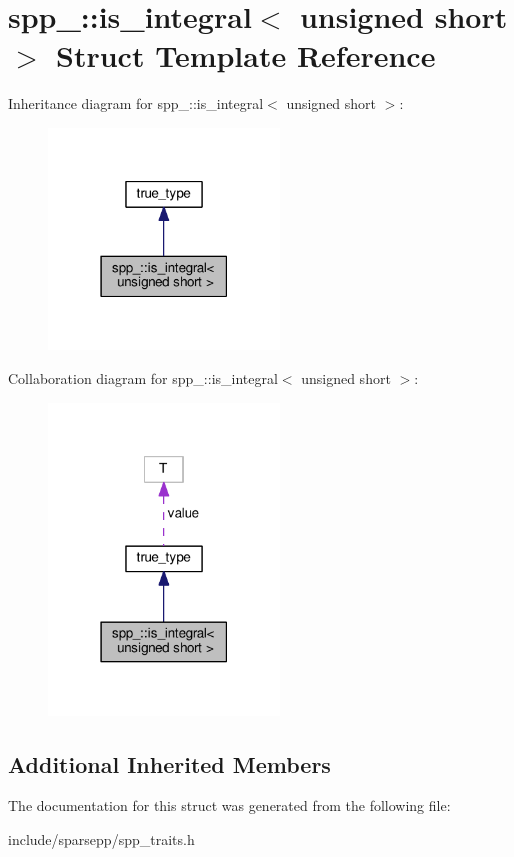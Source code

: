 \hypertarget{structspp___1_1is__integral_3_01unsigned_01short_01_4}{}\section{spp\+\_\+\+:\+:is\+\_\+integral$<$ unsigned short $>$ Struct Template Reference}
\label{structspp___1_1is__integral_3_01unsigned_01short_01_4}


Inheritance diagram for spp\+\_\+\+:\+:is\+\_\+integral$<$ unsigned short $>$\+:\nopagebreak
\begin{figure}[H]
\begin{center}
\leavevmode
\includegraphics[width=174pt]{structspp___1_1is__integral_3_01unsigned_01short_01_4__inherit__graph}
\end{center}
\end{figure}


Collaboration diagram for spp\+\_\+\+:\+:is\+\_\+integral$<$ unsigned short $>$\+:\nopagebreak
\begin{figure}[H]
\begin{center}
\leavevmode
\includegraphics[width=174pt]{structspp___1_1is__integral_3_01unsigned_01short_01_4__coll__graph}
\end{center}
\end{figure}
\subsection*{Additional Inherited Members}


The documentation for this struct was generated from the following file\+:\begin{DoxyCompactItemize}
\item 
include/sparsepp/spp\+\_\+traits.\+h\end{DoxyCompactItemize}
